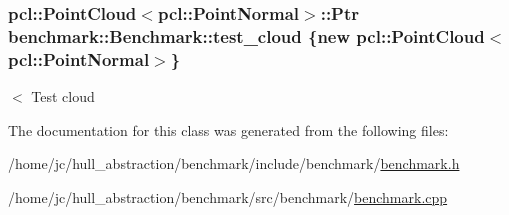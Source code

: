 \subsubsection[{\texorpdfstring{test\+\_\+cloud}{test_cloud}}]{\setlength{\rightskip}{0pt plus 5cm}pcl\+::\+Point\+Cloud$<$pcl\+::\+Point\+Normal$>$\+::Ptr benchmark\+::\+Benchmark\+::test\+\_\+cloud \{new pcl\+::\+Point\+Cloud$<$pcl\+::\+Point\+Normal$>$\}\hspace{0.3cm}{\ttfamily [private]}}\hypertarget{classbenchmark_1_1_benchmark_a9089b4dd75c60319db0450304c073828}{}\label{classbenchmark_1_1_benchmark_a9089b4dd75c60319db0450304c073828}
$<$ Test cloud 

The documentation for this class was generated from the following files\+:\begin{DoxyCompactItemize}
\item 
/home/jc/hull\+\_\+abstraction/benchmark/include/benchmark/\hyperlink{benchmark_8h}{benchmark.\+h}\item 
/home/jc/hull\+\_\+abstraction/benchmark/src/benchmark/\hyperlink{benchmark_8cpp}{benchmark.\+cpp}\end{DoxyCompactItemize}
